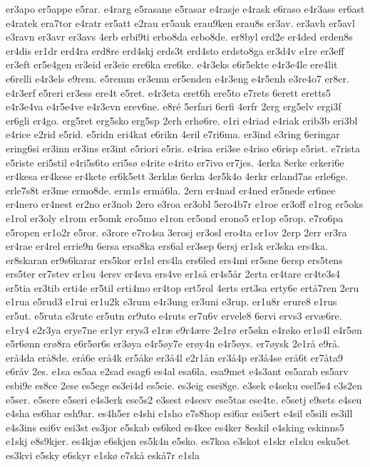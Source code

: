 {er3apo
er5appe
e5rar.
e4rarg
e5rasane
e5rasar
e4rasje
e4rask
e6raso
e4r3ass
er6ast
e4ratek
era7tor
e4ratr
er5att
e2rau
er5auk
erau9ken
erau8s
er3av.
er3avh
er5avl
e3ravn
er3avr
er3avs
4erb
erbi9ti
erbo8da
erbo8de.
er8byl
erd2e
er4ded
erden8s
er4dis
er1dr
erd4ra
erd8re
erd4skj
erds3t
erd4sto
erdsto8ga
er3d4v
e1re
er3eff
er3eft
er5e4gen
er3eid
er3eie
ere6ka
ere6ke.
e4r3eks
e6r5ekte
e4r3e4le
ere4lit
e6relli
e4r3els
e9rem.
e5remm
er3emn
er5enden
e4r3eng
e4r5enh
e3re4o7
er8er.
e4r3erf
e5reri
er3ess
ere4t
e5ret.
e4r3eta
eret6h
ere5to
e7rets
6erett
eretts5
e4r3e4va
e4r5e4ve
e4r3evn
erev6ne.
e8ré
5erfari
6erfi
4erfr
2erg
erg5elv
ergi3f
er6gli
er4go.
erg5ret
erg5sko
erg5sp
2erh
erhø6re.
e1ri
e4riad
e4riak
erib3b
eri3bl
e4rice
e2rid
e5rid.
e5ridn
eri4kat
e6rikn
4eril
e7ri6ma.
er3ind
e3ring
6eringar
ering6si
er3inn
er3ins
er3int
e5riori
e5ris.
e4risa
eri3se
e4riso
e6risp
e5rist.
e7rista
e5riste
eri5stil
e4ri5s6to
eri5sø
e4rite
e4rito
er7ivo
er7jes.
4erka
8erke
erkeri6e
er4kesa
er4kese
er4kete
er6k5ett
3erklæ
6erkn
4er5k4o
4erkr
erland7as
erle6ge.
erle7s8t
er3me
ermo8de.
erm1s
ermå6la.
2ern
er4nad
er4ned
er5nede
er6nee
er4nero
er4nest
er2no
er3nob
2ero
e3roa
er3obl
5ero4b7r
e1roe
er3off
e1rog
er5oks
e1rol
er3oly
e1rom
er5omk
ero5mo
e1ron
er5ond
erono5
er1op
e5rop.
e7ro6pa
e5ropen
er1o2r
e5ror.
e3rore
e7ro4sa
3erosj
er3osl
ero4ta
er1ov
2erp
2err
er3ra
er4rae
er4rel
errie9n
6ersa
ersa8ka
ers6al
er3sep
6ersj
er1sk
er3ska
ers4ka.
er8skaran
er9s6karar
ers5kor
er1sl
ers4la
ers6led
ers4mi
er5sne
6ersp
ers5tens
ers5ter
er7stev
er1su
4ersv
er4sva
ers4ve
er1så
er4s5år
2erta
er4tare
er4te3s4
er5tia
er3tib
erti4e
er5til
erti4mo
er4top
ert5rol
4erts
ert3sa
erty6e
ertå7ren
2eru
e1rua
e5rud3
e1rui
er1u2k
e3rum
e4r3ung
er3uni
e3rup.
er1u8r
erure8
e1rus
er5ut.
e5ruta
e3rute
er5utn
er9uto
e4ruts
er7u6v
ervele8
6ervi
ervs3
ervæ6re.
e1ry4
e2r3ya
erye7ne
er1yr
erys3
e1ræ
e9r4ære
2e1rø
er5økn
e4røko
er1ø4l
e4r5øn
e5r6ønn
erø8ra
e6r5ør6s
er3øya
e4r5øy7e
erøy4n
e4r5øys.
er7øysk
2e1rå
e9rå.
erå4da
erå8de.
erå6e
erå4k
er5åke
er3å4l
e2r1ån
er3å4p
er3å4se
erå6t
er7åta9
e6råv
2es.
e1sa
es5aa
e2sad
esag6
es4al
esa6la.
esa9met
e4s3ant
es5arab
es5arv
esbi9e
es8ce
2ese
es5ege
es3ei4d
es5eie.
es3eig
esei8ge.
e3sek
e4seku
esel5s4
e3s2en
e5ser.
e5sere
e5seri
e4s3erk
ese5s2
e3sest
e4sesv
ese5tas
ese4te.
e5setj
e9sets
e4seu
e4sha
es6har
esh9ar.
es4h5er
e4shi
e1sho
e7s8hop
esi6ar
esi5ert
e4sil
e5sili
es3ill
e4s3ins
esi6v
esi3st
es3jor
e5skab
es6ked
es4kee
es4ker
8eskil
e4sking
eskinns5
e1skj
e8s9kjer.
es4kjæ
e6skjøn
es5k4n
e5sko.
es7koa
e3skot
e1skr
e1sku
esku5et
es3kvi
e5sky
e6skyr
e1skø
e7skå
eskå7r
e1sla
}
